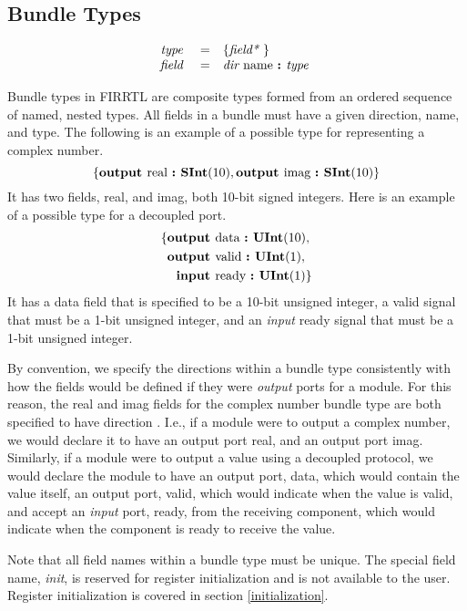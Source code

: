 \documentclass[12pt]{article}
\begin{document}
\subsection{Bundle Types}
\[
\begin{array}{rrl}
\text{\em type\ }       &=     &\{\text{\em field*\ }\}                         \\
\text{\em field\ }      &=     &\text{\em dir\ } \text{name } \text{\bf :\ } \text{\em type\ }        \\
\end{array}
\]

Bundle types in FIRRTL are composite types formed from an ordered sequence of named, nested types. All fields in a bundle must have a given direction, name, and type. The following is an example of a possible type for representing a complex number.
\[
\{\text{\bf output\ } \text{real } \text{\bf :\ } \text{\bf SInt}(10),
         \text{\bf output\ } \text{imag } \text{\bf :\ } \text{\bf SInt}(10)\}
\]
It has two fields, real, and imag, both 10-bit signed integers. Here is an example of a possible type for a decoupled port. 
\[
\begin{aligned}
\{ \text{\bf output\ } &\text{data } \text{\bf :\ } \text{\bf UInt}(10), \\
   \text{\bf output\ } &\text{valid } \text{\bf :\ } \text{\bf UInt}(1), \\
   \text{\bf input\ } &\text{ready } \text{\bf :\ } \text{\bf UInt}(1)\} \\
\end{aligned}
\]
It has a data field that is specified to be a 10-bit unsigned integer, a valid signal that must be a 1-bit unsigned integer, and an {\em input} ready signal that must be a 1-bit unsigned integer.

By convention, we specify the directions within a bundle type consistently with how the fields would be defined if they were {\em output} ports for a module. For this reason, the real and imag fields for the complex number bundle type are both specified to have direction . I.e., if a module were to output a complex number, we would declare it to have an output port real, and an output port imag. Similarly, if a module were to output a value using a decoupled protocol, we would declare the module to have an output port, data, which would contain the value itself, an output port, valid, which would indicate when the value is valid, and accept an {\em input} port, ready, from the receiving component, which would indicate when the component is ready to receive the value.

Note that all field names within a bundle type must be unique. The special field name, {\em init}, is reserved for register initialization and is not available to the user. Register initialization is covered in section \ref{initialization}. 
\end{document}
